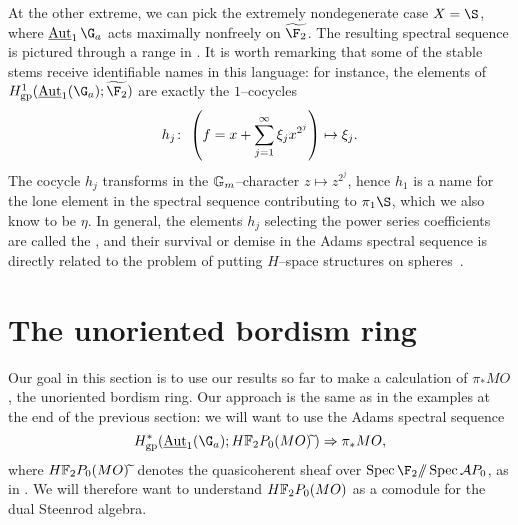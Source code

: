 \begin{example}\label{HopfInvariant1ExampleMO}
At the other extreme, we can pick the extremely nondegenerate case \(X = \S\), where \(\InternalAut_1 \G_a\) acts maximally nonfreely on \(\widetilde{\F_2}\).  The resulting spectral sequence is pictured through a range in .  It is worth remarking that some of the stable stems receive identifiable names in this language: for instance, the elements of \(H^1_{\mathrm{gp}}(\InternalAut_1(\G_a); \widetilde{\F_2})\) are exactly the \(1\)--cocycles \[h_j\colon\thinspace \left( f = x + \sum_{j=1}^\infty \xi_j x^{2^j}\right) \mapsto \xi_j.\]  The cocycle \(h_j\) transforms in the \(\mathbb G_m\)--character \(z \mapsto z^{2^j}\), hence \(h_1\) is a name for the lone element in the spectral sequence contributing to \(\pi_1 \S\), which we also know to be \(\eta\).  In general, the elements \(h_j\) selecting the power series coefficients are called the , and their survival or demise in the Adams spectral sequence is directly related to the problem of putting \(H\)--space structures on spheres~\cite{AdamsVFoS}.
\end{example}












\section{The unoriented bordism ring}\label{PiStarMOSection}

Our goal in this section is to use our results so far to make a calculation of \(\pi_* MO\), the unoriented bordism ring.  Our approach is the same as in the examples at the end of the previous section: we will want to use the Adams spectral sequence \[H^*_{\mathrm{gp}}(\InternalAut_1(\G_a); \HFtwo P_0(MO)\widetilde{\:}) \Rightarrow \pi_* MO,\] where \(\HFtwo P_0(MO)\widetilde{\:}\) denotes the quasicoherent sheaf over \(\Spec \F_2 \mmod \Spec \mathcal AP_0\), as in .  We will therefore want to understand \(\HFtwo P_0(MO)\) as a comodule for the dual Steenrod algebra.

